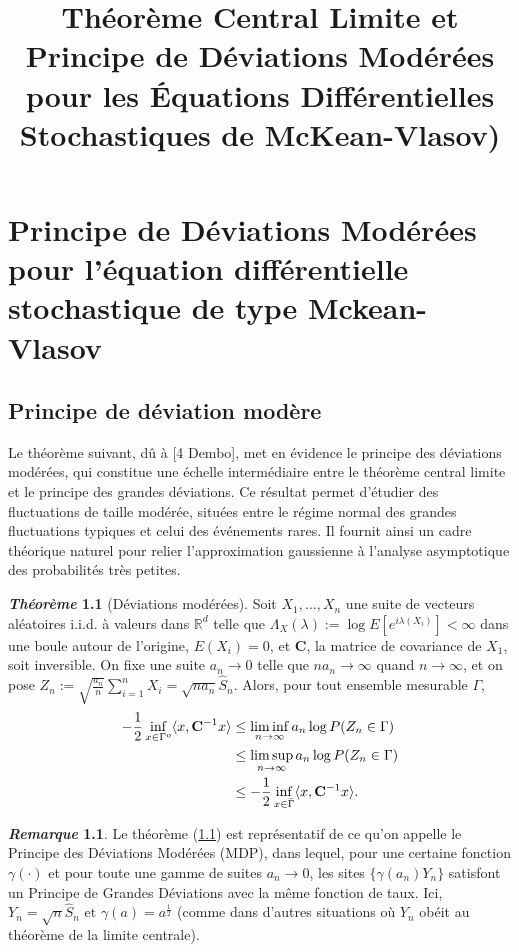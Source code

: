 \documentclass[12pt,a4paper,twoside]{report}%
\title{ \textbf{Théorème Central Limite et Principe de Déviations Modérées pour les Équations Différentielles Stochastiques de McKean-Vlasov)}}
\theoremstyle{definition}
\newtheorem{rem}{\textit{Remarque}}[section]
\newtheorem{thm}[dfn]{\textit{Théorème}}
\numberwithin{equation}{section}
\begin{document}
	\tableofcontents
	\chapter{Principe de Déviations Modérées pour l'équation différentielle stochastique de type Mckean-Vlasov}
	 
	  
	  \section{Principe de déviation modère}
	  Le théorème suivant, dû à [4 Dembo], met en évidence le principe des déviations modérées, qui constitue une échelle intermédiaire entre le théorème central limite et le principe des grandes déviations. Ce résultat permet d’étudier des fluctuations de taille modérée, situées entre le régime normal des grandes fluctuations typiques et celui des événements rares. Il fournit ainsi un cadre théorique naturel pour relier l’approximation gaussienne à l’analyse asymptotique des probabilités très petites.
	  
	  
	  \begin{thm}[Déviations modérées]\label{thm:3.1.1}
	  	Soit \( X_1, \ldots, X_n \) une suite de vecteurs aléatoires i.i.d. à valeurs dans \(\mathbb{R}^d\) telle que \(\Lambda_X(\lambda) := \log E[e^{i\lambda(X_i)}] < \infty\) dans une boule autour de l'origine, \(E(X_i) = 0\), et \(\mathbf{C}\), la matrice de covariance de \(X_1\), soit inversible.  
	  	On fixe une suite \(a_n \to 0\) telle que \(na_n \to \infty\) quand \(n \to \infty\), et on pose \(Z_n := \sqrt{\frac{a_n}{n}} \sum_{i=1}^n X_i = \sqrt{na_n}\hat{S}_n\).  
	  	Alors, pour tout ensemble mesurable \(\Gamma\),
	  	\begin{equation}
	  	\begin{aligned}
	  		-\frac{1}{2} \inf_{x \in \Gamma^o} \langle x, \mathbf{C}^{-1}x \rangle 
	  		&\leq \liminf_{n \to \infty} a_n \log P(Z_n \in \Gamma) \notag \\
	  		&\leq \limsup_{n \to \infty} a_n \log P(Z_n \in \Gamma) \notag \\
	  		&\leq -\frac{1}{2} \inf_{x \in \bar{\Gamma}} \langle x, \mathbf{C}^{-1}x \rangle.
	  	\end{aligned}
  	\end{equation}
	  \end{thm}
	  
	  
	 \begin{rem}
	 	Le théorème (\ref{thm:3.1.1}) est représentatif de ce qu'on appelle le Principe des Déviations Modérées (MDP), dans lequel, pour une certaine fonction $\gamma(\cdot)$ et pour toute une gamme de suites $a_n\to 0$, les sites $\{\gamma(a_n)Y_n\}$ satisfont un Principe de Grandes Déviations avec la même fonction de taux. Ici, $Y_n=\sqrt{n}\hat{S}_n \text{ et } \gamma(a)=a^{\frac{1}{2}}$ (comme dans d'autres situations où $Y_n$ obéit au théorème de la limite centrale).
	 \end{rem}
	
\end{document}
